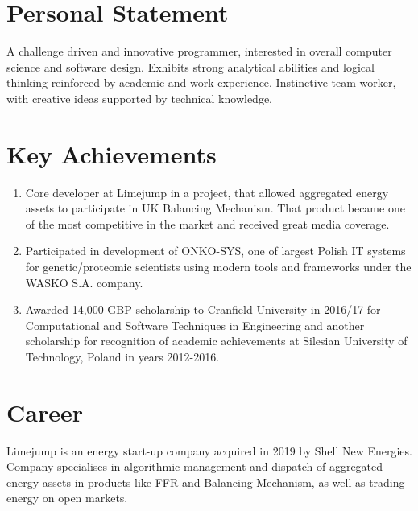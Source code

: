 \documentclass[12pt,english]{resume}
\begin{document}

	\begin{center}
		
		
	\end{center}
	
	\section{Personal Statement}
		A challenge driven and innovative programmer, interested in overall computer
		science and software design. Exhibits strong analytical abilities and logical
		thinking reinforced by academic and work experience. Instinctive team worker,
		with creative ideas supported by technical knowledge.

	\section{Key Achievements}
		\begin{enumerate}[i]
			\item Core developer at Limejump in a project, that allowed aggregated energy assets to participate in UK Balancing Mechanism. That product became one of the most competitive in the market and received great media coverage.
			\item Participated in development of ONKO-SYS, one of largest Polish IT systems for genetic/proteomic scientists using modern tools and frameworks under the WASKO S.A. company.
			\item Awarded 14,000 GBP scholarship to Cranfield University in 2016/17 for Computational and Software Techniques in Engineering and another scholarship for recognition of academic achievements at Silesian University of Technology, Poland in years 2012-2016.
		\end{enumerate}

	\section{Career}

		Limejump is an energy start-up company acquired in 2019 by Shell New Energies. Company specialises in algorithmic management and dispatch of aggregated energy assets in products like FFR and Balancing Mechanism, as well as trading energy on open markets.
\end{document}
